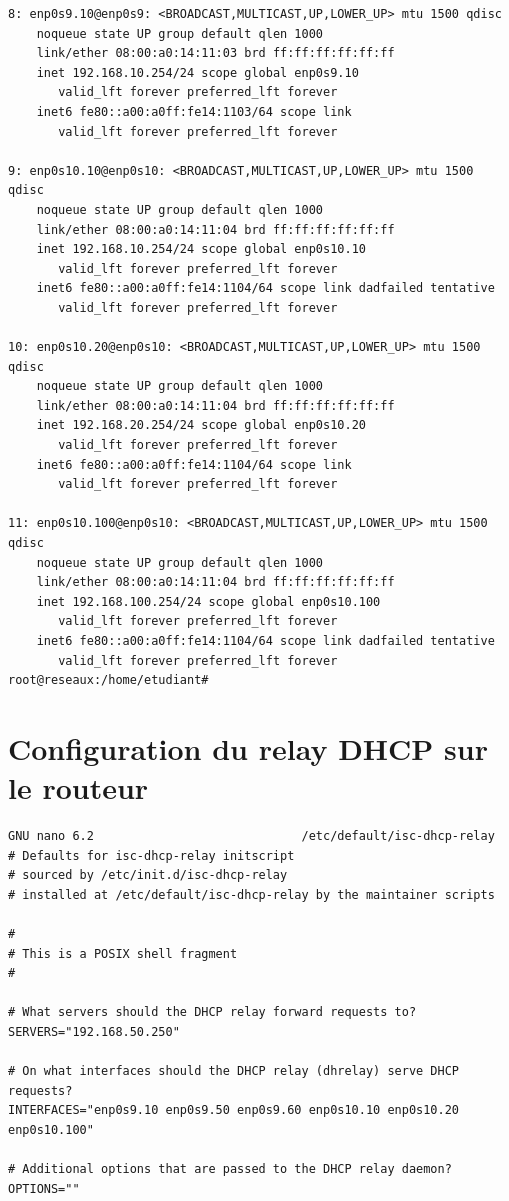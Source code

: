 \documentclass[a4paper,12pt,openany]{report}
\begin{document}
\begin{verbatim}
8: enp0s9.10@enp0s9: <BROADCAST,MULTICAST,UP,LOWER_UP> mtu 1500 qdisc 
    noqueue state UP group default qlen 1000
    link/ether 08:00:a0:14:11:03 brd ff:ff:ff:ff:ff:ff
    inet 192.168.10.254/24 scope global enp0s9.10
       valid_lft forever preferred_lft forever
    inet6 fe80::a00:a0ff:fe14:1103/64 scope link 
       valid_lft forever preferred_lft forever

9: enp0s10.10@enp0s10: <BROADCAST,MULTICAST,UP,LOWER_UP> mtu 1500 qdisc 
    noqueue state UP group default qlen 1000
    link/ether 08:00:a0:14:11:04 brd ff:ff:ff:ff:ff:ff
    inet 192.168.10.254/24 scope global enp0s10.10
       valid_lft forever preferred_lft forever
    inet6 fe80::a00:a0ff:fe14:1104/64 scope link dadfailed tentative 
       valid_lft forever preferred_lft forever

10: enp0s10.20@enp0s10: <BROADCAST,MULTICAST,UP,LOWER_UP> mtu 1500 qdisc 
    noqueue state UP group default qlen 1000
    link/ether 08:00:a0:14:11:04 brd ff:ff:ff:ff:ff:ff
    inet 192.168.20.254/24 scope global enp0s10.20
       valid_lft forever preferred_lft forever
    inet6 fe80::a00:a0ff:fe14:1104/64 scope link 
       valid_lft forever preferred_lft forever

11: enp0s10.100@enp0s10: <BROADCAST,MULTICAST,UP,LOWER_UP> mtu 1500 qdisc 
    noqueue state UP group default qlen 1000
    link/ether 08:00:a0:14:11:04 brd ff:ff:ff:ff:ff:ff
    inet 192.168.100.254/24 scope global enp0s10.100
       valid_lft forever preferred_lft forever
    inet6 fe80::a00:a0ff:fe14:1104/64 scope link dadfailed tentative 
       valid_lft forever preferred_lft forever
root@reseaux:/home/etudiant# 
            \end{verbatim}
            \section{Configuration du relay DHCP sur le routeur}
            \begin{verbatim}
GNU nano 6.2                             /etc/default/isc-dhcp-relay                                      
# Defaults for isc-dhcp-relay initscript
# sourced by /etc/init.d/isc-dhcp-relay
# installed at /etc/default/isc-dhcp-relay by the maintainer scripts

#
# This is a POSIX shell fragment
#

# What servers should the DHCP relay forward requests to?
SERVERS="192.168.50.250"

# On what interfaces should the DHCP relay (dhrelay) serve DHCP requests?
INTERFACES="enp0s9.10 enp0s9.50 enp0s9.60 enp0s10.10 enp0s10.20 enp0s10.100"

# Additional options that are passed to the DHCP relay daemon?
OPTIONS=""
            \end{verbatim}
\end{document}
